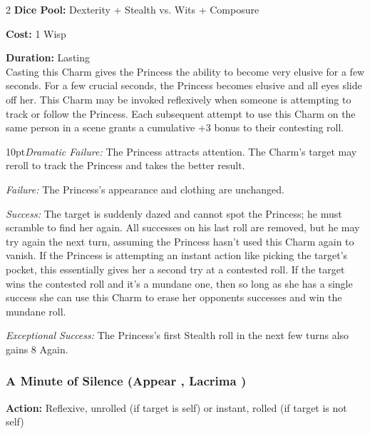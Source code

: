 \begin{multicols}{2}
\noindent \textbf{Dice Pool:} Dexterity + Stealth vs. Wits + Composure

\noindent \textbf{Cost:} 1 Wisp 

\noindent \textbf{Duration:} Lasting \\

\noindent Casting this Charm gives the Princess the ability to become very elusive for a few seconds. For a few crucial seconds, the Princess becomes elusive and all eyes slide off her. This Charm may be invoked reflexively when someone is attempting to track or follow the Princess. Each subsequent attempt to use this Charm on the same person in a scene grants a cumulative +3 bonus to their contesting roll.

\begin{myindentpar}{10pt}\emph{Dramatic Failure:} The Princess attracts attention. The Charm's target may reroll to track the Princess and takes the better result. 

    \emph{Failure:} The Princess's appearance and clothing are unchanged.

    \emph{Success:} The target is suddenly dazed and cannot spot the Princess; he must scramble to find her again. All successes on his last roll are removed, but he may try again the next turn, assuming the Princess hasn't used this Charm again to vanish. If the Princess is attempting an instant action like picking the target's pocket, this essentially gives her a second try at a contested roll. If the target wins the contested roll and it's a mundane one, then so long as she has a single success she can use this Charm to erase her opponents successes and win the mundane roll. 

    \emph{Exceptional Success:} The Princess's first Stealth roll in the next few turns also gains 8 Again.\end{myindentpar}

\subsubsection*{A Minute of Silence (Appear \textbullet, Lacrima \textbullet )}

\noindent \textbf{Action:}  Reflexive, unrolled (if target is self) or instant, rolled (if target is not self)


\end{multicols}
